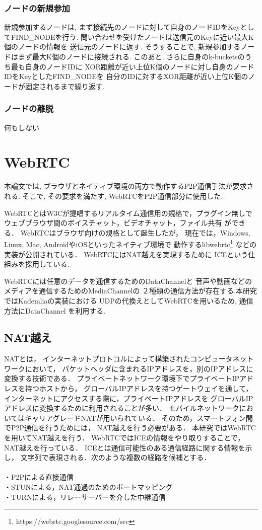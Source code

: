 \documentclass[sotsuron]{jcsie}
\begin{document}
\subsubsection{ノードの新規参加}
新規参加するノードは, 
まず接続先のノードに対して自身のノードIDをKeyとしてFIND\_NODEを行う.
問い合わせを受けたノードは送信元のKeyに近い最大K個のノードの情報を
送信元のノードに返す.
そうすることで, 新規参加するノードはまず最大K個のノードに接続される.
このあと, さらに自身のk-bucketsのうち最も自身のノードIDに
XOR距離が近い上位K個のノードに対し自身のノードIDをKeyとしたFIND\_NODEを
自分のIDに対するXOR距離が近い上位K個のノードが固定されるまで繰り返す.

\subsubsection{ノードの離脱}
何もしない

\section{WebRTC}
本論文では, 
ブラウザとネイティブ環境の両方で動作するP2P通信手法が要求される.
そこで, その要求を満たす, WebRTCをP2P通信部分に使用した.

WebRTCとはW3Cが提唱するリアルタイム通信用の規格で，プラグイン無しで
ウェブブラウザ間のボイスチャット，ビデオチャット，ファイル共有
ができる．
WebRTCはブラウザ向けの規格として誕生したが，
現在では，Windows, Linux, Mac, AndroidやiOSといったネイティブ環境で
動作するlibwebrtc\footnote{https://webrtc.googlesource.com/src}
などの実装が公開されている．
WebRTCにはNAT越えを実現するために
ICE\cite{rosenberg2010interactive}という仕組みを採用している.

WebRTCには任意のデータを通信するためのDataChannelと
音声や動画などのメディアを通信するためのMediaChannelの
２種類の通信方法が存在する.本研究ではKademliaの実装における
UDPの代換えとしてWebRTCを用いるため, 通信方法にDataChannel
を利用する.

\subsection{NAT越え}
NATとは，
インターネットプロトコルによって構築されたコンピュータネットワークにおいて，
パケットヘッダに含まれるIPアドレスを，別のIPアドレスに変換する技術である．
プライベートネットワーク環境下でプライベートIPアドレスを持つホストから，
グローバルIPアドレスを持つゲートウェイを通して，
インターネットにアクセスする際に，プライベートIPアドレスを
グローバルIPアドレスに変換するために利用されることが多い．
モバイルネットワークにおいてはキャリアグレードNATが用いられている．
そのため，スマートフォン間でP2P通信を行うためには，
NAT越えを行う必要がある．
本研究ではWebRTCを用いてNAT越えを行う．
WebRTCではICEの情報をやり取りすることで，NAT越えを行っている．
ICEとは通信可能性のある通信経路に関する情報を示し，
文字列で表現される．次のような複数の経路を候補とする．
\\\\
・P2Pによる直接通信\\
・STUNによる，NAT通過のためのポートマッピング\\
・TURNによる，リレーサーバーを介した中継通信\\
\end{document}
